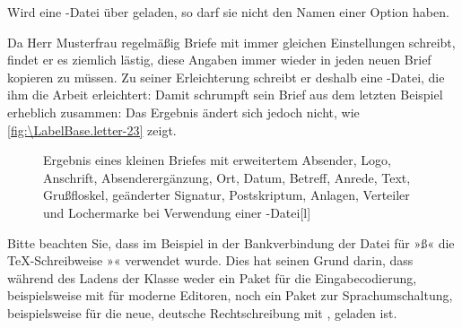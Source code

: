 Wird eine -Datei über
 geladen, so darf sie nicht den Namen einer Option
haben.

\begin{Example}
  Da Herr Musterfrau regelmäßig Briefe mit immer gleichen Einstellungen
  schreibt, findet er es ziemlich lästig, diese Angaben immer wieder in jeden
  neuen Brief kopieren zu müssen. Zu seiner Erleichterung schreibt er deshalb
  eine -Datei, die ihm die Arbeit erleichtert:%
  Damit schrumpft sein Brief aus dem letzten Beispiel erheblich zusammen:
  Das Ergebnis ändert sich jedoch nicht, wie \autoref{fig:\LabelBase.letter-23}
  zeigt.
  \begin{figure}
    \setcapindent{0pt}%
    \begin{captionbeside}{Ergebnis eines
        kleinen Briefes mit erweitertem Absender, Logo, Anschrift,
        Absenderergänzung, Ort, Datum, Betreff, Anrede, Text, Grußfloskel,
        geänderter Signatur, Postskriptum, Anlagen, Verteiler und Lochermarke
        bei Verwendung einer -Datei}[l]
    \end{captionbeside}
    \label{fig:\LabelBase.letter-23}
  \end{figure}
\end{Example}

Bitte beachten Sie, dass im Beispiel in der Bankverbindung
der Datei  für »ß« die \TeX-Schreibweise »« verwendet
wurde. Dies hat seinen Grund darin, dass während des Ladens der Klasse 
weder ein Paket für die Eingabecodierung, beispielsweise mit 
 für moderne
Editoren, noch ein Paket zur Sprachumschaltung, beispielsweise für die neue,
deutsche Rechtschreibung mit
, geladen ist.

